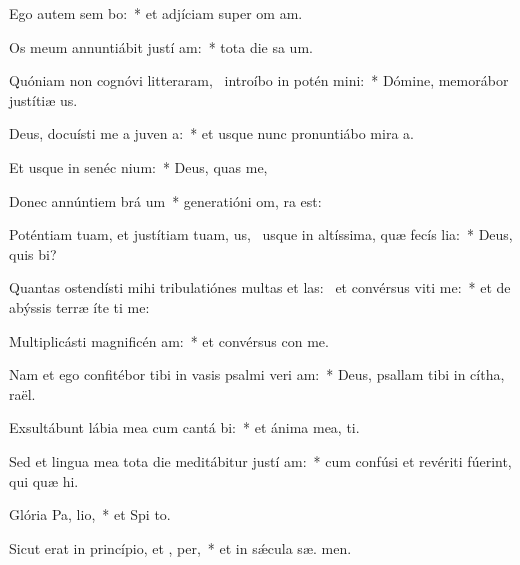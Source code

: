 \item Ego autem sem bo:~* et adjíciam super om  am.
\item Os meum annuntiábit justí am:~* tota die sa um.
\item Quóniam non cognóvi litteraram,~\pscross{} introíbo in potén mini:~* Dómine, memorábor justítiæ  us.
\item Deus, docuísti me a juven a:~* et usque nunc pronuntiábo mira a.
\item Et usque in senéc  nium:~* Deus,  quas me,
\item Donec annúntiem brá um~* generatióni om,  ra est:
\item Poténtiam tuam, et justítiam tuam, us,~\pscross{} usque in altíssima, quæ fecís lia:~* Deus, quis  bi?
\item Quantas ostendísti mihi tribulatiónes multas et las:~\pscross{} et convérsus viti me:~* et de abýssis terræ íte ti me:
\item Multiplicásti magnificén am:~* et convérsus con  me.
\item Nam et ego confitébor tibi in vasis psalmi veri am:~* Deus, psallam tibi in cítha,  raël.
\item Exsultábunt lábia mea cum cantá bi:~* et ánima mea,  ti.
\item Sed et lingua mea tota die meditábitur justí am:~* cum confúsi et revériti fúerint, qui quæ  hi.
\item Glória Pa,  lio,~* et Spi to.
\item Sicut erat in princípio, et ,  per,~* et in sǽcula sæ. men.
